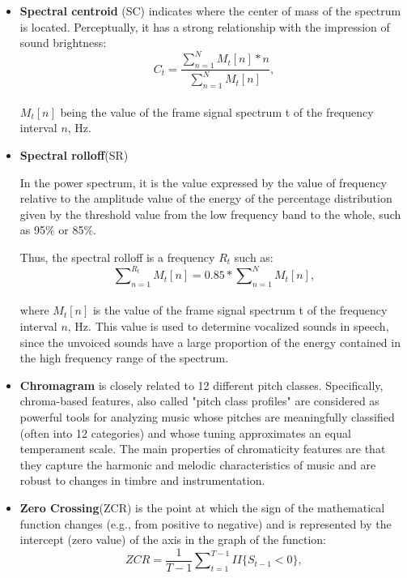 \documentclass[ams]{U-AizuGT}
\begin{document}
\begin{itemize}
\setlength{\leftskip}{-4mm}
\item {\textbf{Spectral centroid} (SC) indicates where the center of mass of the spectrum is located. Perceptually, it has a strong relationship with the impression of sound brightness:
\\
\begin{equation}
C_t=\frac{\sum\nolimits_{n=1}^N M_t[n]*n}{\sum\nolimits_{n=1}^N M_t[n]},
\end{equation}
\\
$M_t[n]$ being the value of the frame signal spectrum t of the frequency interval $n$, Hz.
}
\item {\textbf{Spectral rolloff}(SR)\par
In the power spectrum, it is the value expressed by the value of frequency relative to the amplitude value of the energy of the percentage distribution given by the threshold value from the low frequency band to the whole, such as 95\% or 85\%.\par
Thus, the spectral rolloff is a frequency $R_t$ such as:
\\
\begin{equation}
\sum\nolimits_{n=1}^{R_t} M_t[n]=0.85*\sum\nolimits_{n=1}^N M_t[n],
\end{equation}
\\
where $M_t[n]$ is the value of the frame signal spectrum t of the frequency interval $n$, Hz. This value is used to determine vocalized sounds in speech, since the unvoiced sounds have a large proportion of the energy contained in the high frequency range of the spectrum.
}
\item {\textbf{Chromagram} is closely related to 12 different pitch classes. Specifically, chroma-based features, also called "pitch class profiles" are considered as powerful tools for analyzing music whose pitches are meaningfully classified (often into 12 categories) and whose tuning approximates an equal temperament scale. The main properties of chromaticity features are that they capture the harmonic and melodic characteristics of music and are robust to changes in timbre and instrumentation.}
\item {\textbf{Zero Crossing}(ZCR) is the point at which the sign of the mathematical function changes (e.g., from positive to negative) and is represented by the intercept (zero value) of the axis in the graph of the function:
\\
\begin{equation}
ZCR=\frac{1}{T-1}\sum\nolimits_{t=1}^{T-1} II\{S_{t-1}<0\},

\end{equation}}
\end{itemize}
\end{document}
